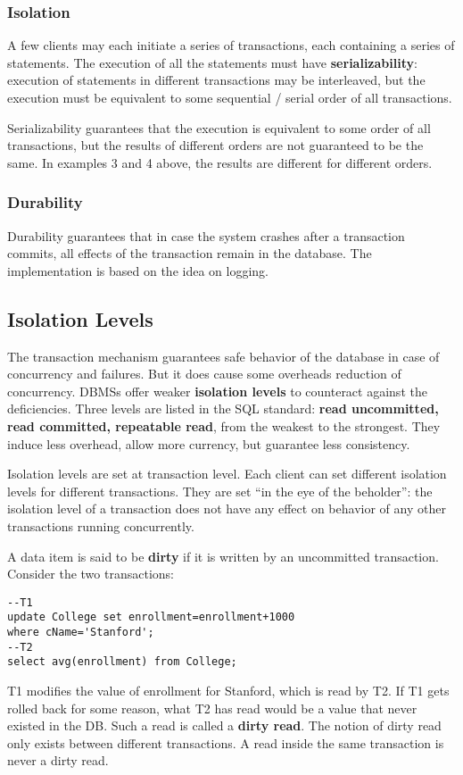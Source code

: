 \subsubsection{Isolation}
A few clients may each initiate a series of transactions, each containing a series of statements. The execution of all the statements must have \textbf{serializability}: execution of statements in different transactions may be interleaved, but the execution must be equivalent to some sequential / serial order of all transactions.

Serializability guarantees that the execution is equivalent to some order of all transactions, but the results of different orders are not guaranteed to be the same. In examples 3 and 4 above, the results are different for different orders.
\subsubsection{Durability}
Durability guarantees that in case the system crashes after a transaction commits, all effects of the transaction remain in the database. The implementation is based on the idea on logging. 
\subsection{Isolation Levels}
The transaction mechanism guarantees safe behavior of the database in case of concurrency and failures. But it does cause some overheads reduction of concurrency. DBMSs offer weaker \textbf{isolation levels} to counteract against the deficiencies. Three levels are listed in the SQL standard: \textbf{read uncommitted, read committed, repeatable read}, from the weakest to the strongest. They induce less overhead, allow more currency, but guarantee less consistency.  

Isolation levels are set at transaction level. Each client can set different isolation levels for different transactions. They are set ``in the eye of the beholder'': the isolation level of a transaction does not have any effect on behavior of any other transactions running concurrently.

A data item is said to be \textbf{dirty} if it is written by an uncommitted transaction. Consider the two transactions:
\begin{lstlisting}
--T1
update College set enrollment=enrollment+1000
where cName='Stanford';
--T2
select avg(enrollment) from College;
\end{lstlisting}
T1 modifies the value of enrollment for Stanford, which is read by T2. If T1 gets rolled back for some reason, what T2 has read would be a value that never existed in the DB. Such a read is called a \textbf{dirty read}. The notion of dirty read only exists between different transactions. A read inside the same transaction is never a dirty read.

